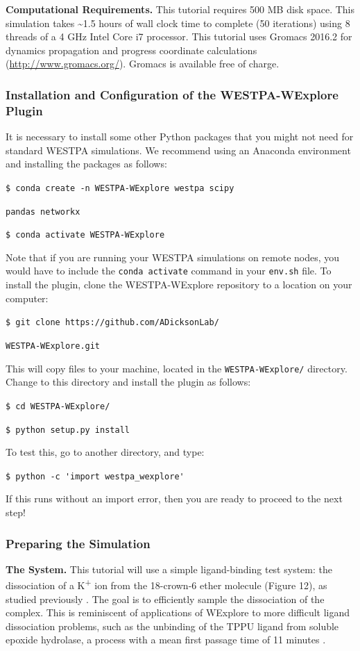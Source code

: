 \documentclass[9pt,tutorial,pubversion]{livecoms}
\begin{document}
\textbf{Computational Requirements.} This tutorial requires 500 MB disk space. 
This simulation takes \textasciitilde 1.5 hours of wall clock time to complete (50 iterations) using 8 threads of a 4 GHz Intel Core i7 processor.  
This tutorial uses Gromacs 2016.2 for dynamics propagation and progress coordinate calculations (\url{http://www.gromacs.org/}).  
Gromacs is available free of charge.

\subsubsection{Installation and Configuration of the WESTPA-WExplore Plugin}

It is necessary to install some other Python packages that you might not need for standard WESTPA simulations. 
We recommend using an Anaconda environment and installing the packages as follows:

\verb|$ conda create -n WESTPA-WExplore westpa scipy|

\verb|pandas networkx|

\verb|$ conda activate WESTPA-WExplore|

Note that if you are running your WESTPA simulations on remote nodes, you would have to include the \verb|conda activate| command in your \verb|env.sh| file. 
To install the plugin, clone the WESTPA-WExplore repository to a location on your computer:  

\verb|$ git clone https://github.com/ADicksonLab/|

\verb|WESTPA-WExplore.git|

This will copy files to your machine, located in the \verb|WESTPA-WExplore/| directory. 
Change to this directory and install the plugin as follows:

\verb|$ cd WESTPA-WExplore/|

\verb|$ python setup.py install|

To test this, go to another directory, and type:

\verb|$ python -c 'import westpa_wexplore'|

If this runs without an import error, then you are ready to proceed to the next step! 

\subsubsection{Preparing the Simulation}

\textbf{The System.} This tutorial will use a simple ligand-binding test system: the dissociation of a K\textsuperscript{+} ion from the 18-crown-6 ether molecule (Figure 12), as studied previously \citep{Zwier2011}. 
The goal is to efficiently sample the dissociation of the complex. 
This is reminiscent of applications of WExplore to more difficult ligand dissociation problems, such as the unbinding of the TPPU ligand from soluble epoxide hydrolase, a process with a mean first passage time of 11 minutes \citep{Lotz2018}.
\end{document}
